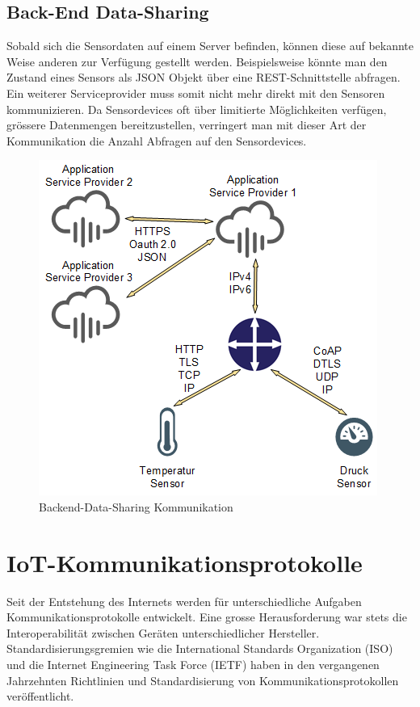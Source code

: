 \subsection{Back-End Data-Sharing}
Sobald sich die Sensordaten auf einem Server befinden, können diese auf bekannte Weise anderen zur Verfügung gestellt werden. Beispielsweise könnte man den Zustand eines Sensors als JSON Objekt über eine REST-Schnittstelle abfragen. Ein weiterer Serviceprovider muss somit nicht mehr direkt mit den Sensoren kommunizieren. Da Sensordevices oft über limitierte Möglichkeiten verfügen, grössere Datenmengen bereitzustellen, verringert man mit dieser Art der Kommunikation die Anzahl Abfragen auf den Sensordevices. 
\begin{figure}[H]
\centering
\includegraphics[scale=0.8]{../02_Analyse/images/backend-data-sharing.png}
\caption{Backend-Data-Sharing Kommunikation}
\end{figure}

\newpage

\section{IoT-Kommunikationsprotokolle}
Seit der Entstehung des Internets werden für unterschiedliche Aufgaben Kommunikationsprotokolle entwickelt. Eine grosse Herausforderung war stets die Interoperabilität zwischen Geräten unterschiedlicher Hersteller. Standardisierungsgremien wie die International Standards Organization (ISO) und die Internet Engineering Task Force (IETF) haben in den vergangenen Jahrzehnten Richtlinien und Standardisierung von Kommunikationsprotokollen veröffentlicht. 

